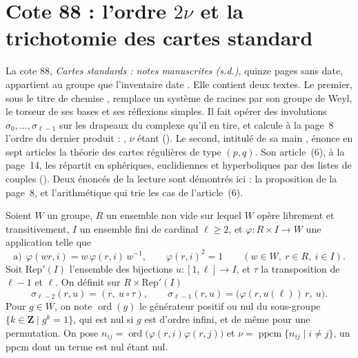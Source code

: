 \section[Cote 88 : l'ordre $2\nu$ et la trichotomie des cartes standard]{Cote 88 : l'ordre $2\nu$ et la trichotomie des cartes standard\protect{}}\label{sec:88}

La cote 88, \emph{Cartes standards : notes manuscrites (s.d.)}, quinze pages sans date, appartient au groupe  que l'inventaire date . Elle contient deux textes. Le premier, sous le titre de chemise , remplace un système de racines par son groupe de Weyl, le torseur de ses bases et ses réflexions simples. Il fait opérer des involutions $\sigma_0, \dots, \sigma_{\ell-1}$ sur les drapeaux du complexe qu'il en tire, et calcule à la page~8 l'ordre du dernier produit : , $\nu$ étant  (). Le second, intitulé de sa main , énonce en sept articles la théorie des cartes régulières de type $(p, q)$. Son article~(6), à la page~14, les répartit en sphériques, euclidiennes et hyperboliques par des listes de couples (). Deux énoncés de la lecture sont démontrés ici : la proposition de la page~8, et l'arithmétique qui trie les cas de l'article~(6).

\begin{definition}
Soient $W$ un groupe, $R$ un ensemble non vide sur lequel $W$ opère librement et transitivement, $I$ un ensemble fini de cardinal $\ell \geq 2$, et $\varphi : R \times I \to W$ une application telle que
\[
  \text{a)}\ \ \varphi(wr, i) = w\,\varphi(r, i)\,w^{-1}, \qquad \varphi(r, i)^2 = 1 \qquad (w \in W,\ r \in R,\ i \in I).
\]
Soit $\mathrm{Rep}'(I)$ l'ensemble des bijections $u : [1, \ell] \to I$, et $\tau$ la transposition de $\ell - 1$ et $\ell$. On définit sur $R \times \mathrm{Rep}'(I)$
\[
  \sigma_{\ell-2}(r, u) = (r,\ u \circ \tau), \qquad
  \sigma_{\ell-1}(r, u) = \bigl(\varphi(r, u(\ell))\, r,\ u\bigr).
\]
Pour $g \in W$, on note $\operatorname{ord}(g)$ le générateur positif ou nul du sous-groupe $\{k \in \mathbf Z \mid g^k = 1\}$, qui est nul si $g$ est d'ordre infini, et de même pour une permutation. On pose $n_{ij} = \operatorname{ord}\bigl(\varphi(r, i)\varphi(r, j)\bigr)$ et $\nu = \operatorname{ppcm}\{n_{ij} \mid i \neq j\}$, un ppcm dont un terme est nul étant nul.
\end{definition}

